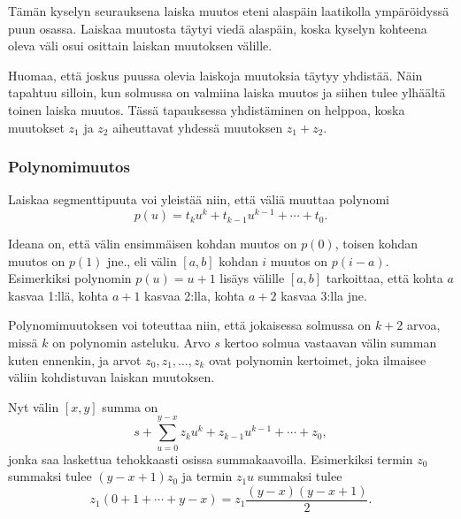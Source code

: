 \begin{center}
\end{center}
Tämän kyselyn seurauksena laiska muutos eteni alaspäin
laatikolla ympäröidyssä puun osassa.
Laiskaa muutosta täytyi viedä alaspäin, koska kyselyn
kohteena oleva väli osui osittain laiskan muutoksen välille.

Huomaa, että joskus puussa olevia laiskoja muutoksia täytyy yhdistää.
Näin tapahtuu silloin, kun solmussa on valmiina laiska muutos
ja siihen tulee ylhäältä toinen laiska muutos.
Tässä tapauksessa yhdistäminen on helppoa,
koska muutokset $z_1$ ja $z_2$ aiheuttavat yhdessä muutoksen $z_1+z_2$.

\subsubsection{Polynomimuutos}

Laiskaa segmenttipuuta voi yleistää niin,
että väliä muuttaa polynomi
\[p(u) = t_k u^k + t_{k-1} u^{k-1} + \cdots + t_0.\]

Ideana on, että välin ensimmäisen kohdan
muutos on $p(0)$, toisen kohdan muutos on $p(1)$ jne.,
eli välin $[a,b]$ kohdan $i$ muutos on $p(i-a)$.
Esimerkiksi polynomin $p(u)=u+1$ lisäys välille
$[a,b]$ tarkoittaa, että kohta $a$ kasvaa 1:llä,
kohta $a+1$ kasvaa 2:lla, kohta $a+2$ kasvaa 3:lla jne.

Polynomimuutoksen voi toteuttaa niin,
että jokaisessa solmussa on $k+2$ arvoa,
missä $k$ on polynomin asteluku.
Arvo $s$ kertoo solmua vastaavan välin summan kuten ennenkin,
ja arvot $z_0,z_1,\ldots,z_k$ ovat polynomin kertoimet,
joka ilmaisee väliin kohdistuvan laiskan muutoksen.

Nyt välin $[x,y]$ summa on
\[s+\sum_{u=0}^{y-x} z_k u^k + z_{k-1} u^{k-1} + \cdots + z_0,\]
jonka saa laskettua tehokkaasti osissa summakaavoilla.
Esimerkiksi termin $z_0$ summaksi tulee
$(y-x+1)z_0$ ja termin $z_1 u$ summaksi tulee
\[z_1(0+1+\cdots+y-x) = z_1 \frac{(y-x)(y-x+1)}{2} .\]

